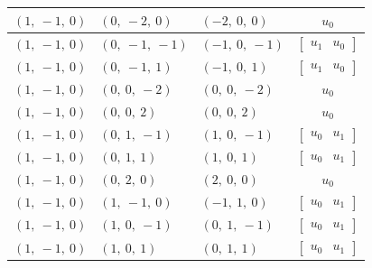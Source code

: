 \documentclass[11pt]{article}
\theoremstyle{definition}
\begin{document}
\begin{longtable}{|l|l|l|c|}
    \hline
    $\left( 1, \  -1, \  0\right)$ & $\left( 0, \  -2, \  0\right)$ & $\left( -2, \  0, \  0\right)$ & $u_{0}$ \\
    \hline
    $\left( 1, \  -1, \  0\right)$ & $\left( 0, \  -1, \  -1\right)$ & $\left( -1, \  0, \  -1\right)$ & $\left[\begin{matrix}u_{1} & u_{0}\end{matrix}\right]$ \\
    \hline
    $\left( 1, \  -1, \  0\right)$ & $\left( 0, \  -1, \  1\right)$ & $\left( -1, \  0, \  1\right)$ & $\left[\begin{matrix}u_{1} & u_{0}\end{matrix}\right]$ \\
    \hline
    $\left( 1, \  -1, \  0\right)$ & $\left( 0, \  0, \  -2\right)$ & $\left( 0, \  0, \  -2\right)$ & $u_{0}$ \\
    \hline
    $\left( 1, \  -1, \  0\right)$ & $\left( 0, \  0, \  2\right)$ & $\left( 0, \  0, \  2\right)$ & $u_{0}$ \\
    \hline
    $\left( 1, \  -1, \  0\right)$ & $\left( 0, \  1, \  -1\right)$ & $\left( 1, \  0, \  -1\right)$ & $\left[\begin{matrix}u_{0} & u_{1}\end{matrix}\right]$ \\
    \hline
    $\left( 1, \  -1, \  0\right)$ & $\left( 0, \  1, \  1\right)$ & $\left( 1, \  0, \  1\right)$ & $\left[\begin{matrix}u_{0} & u_{1}\end{matrix}\right]$ \\
    \hline
    $\left( 1, \  -1, \  0\right)$ & $\left( 0, \  2, \  0\right)$ & $\left( 2, \  0, \  0\right)$ & $u_{0}$ \\
    \hline
    $\left( 1, \  -1, \  0\right)$ & $\left( 1, \  -1, \  0\right)$ & $\left( -1, \  1, \  0\right)$ & $\left[\begin{matrix}u_{0} & u_{1}\end{matrix}\right]$ \\
    \hline
    $\left( 1, \  -1, \  0\right)$ & $\left( 1, \  0, \  -1\right)$ & $\left( 0, \  1, \  -1\right)$ & $\left[\begin{matrix}u_{0} & u_{1}\end{matrix}\right]$ \\
    \hline
    $\left( 1, \  -1, \  0\right)$ & $\left( 1, \  0, \  1\right)$ & $\left( 0, \  1, \  1\right)$ & $\left[\begin{matrix}u_{0} & u_{1}\end{matrix}\right]$ \\

\end{longtable}
\end{document}
